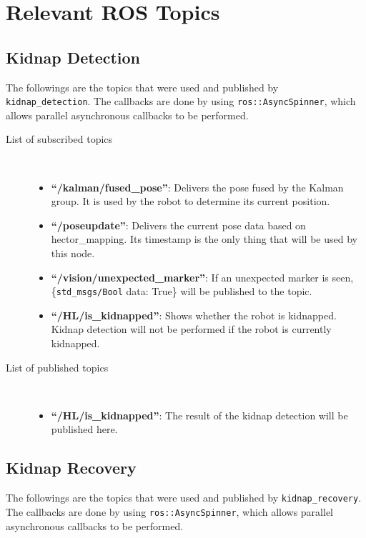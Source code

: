 \section{Relevant ROS Topics}\label{section:relevant_ros_topics}

\subsection{Kidnap Detection}
The followings are the topics that were used and published by \texttt{kidnap\_detection}. The callbacks are done by using \texttt{ros::AsyncSpinner}, which allows parallel asynchronous callbacks to be performed.


\begin{description}
\item[List of subscribed topics]\
	\begin{itemize}
	\item  \textbf{``/kalman/fused\_pose''}: Delivers the pose fused by the Kalman group. It is used by the robot to determine its current position.
	\item  \textbf{``/poseupdate''}: Delivers the current pose data based on hector\_mapping. Its timestamp is the only thing that will be used by this node.
	\item  \textbf{``/vision/unexpected\_marker''}: If an unexpected marker is seen, \{\texttt{std\_msgs/Bool} data: True\} will be published to the topic.
	\item  \textbf{``/HL/is\_kidnapped''}: Shows whether the robot is kidnapped. Kidnap detection will not be performed if the robot is currently kidnapped.
	\end{itemize}
\end{description}

\begin{description}
\item[List of published topics]\
	\begin{itemize}
	\item \textbf{``/HL/is\_kidnapped''}: The result of the kidnap detection will be published here.
	\end{itemize}
\end{description}

\subsection{Kidnap Recovery} \label{subsection:kidnap_recovery}

The followings are the topics that were used and published by \texttt{kidnap\_recovery}. The callbacks are done by using \texttt{ros::AsyncSpinner}, which allows parallel asynchronous callbacks to be performed.

